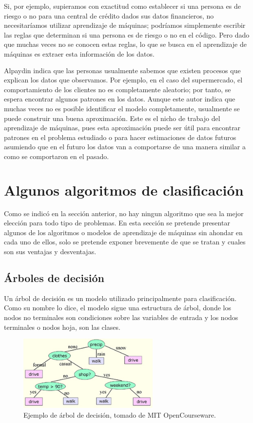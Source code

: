 \documentclass[a4paper, 11pt, oneside]{report}
\begin{document}
Si, por ejemplo, supieramos con exactitud como establecer si una persona es de riesgo o no para una central de crédito dados sus datos financieros, no necesitaríamos utilizar
aprendizaje de máquinas; podríamos simplemente escribir las reglas que determinan si una persona es de riesgo o no en el código. Pero dado que muchas veces no se conocen estas reglas, lo que se busca en el aprendizaje de máquinas es extraer esta información de los datos.\newline

Alpaydin indica que las personas usualmente sabemos que existen procesos que explican los datos que observamos. Por ejemplo, en el caso del supermercado, el comportamiento de los clientes no es completamente aleatorio; por tanto, se espera encontrar algunos patrones en los datos. Aunque este autor indica que muchas veces no es posible identificar el modelo completamente, usualmente se puede construir una buena aproximación. Este es el nicho de trabajo del aprendizaje de máquinas, pues esta aproximación puede ser útil para encontrar patrones en el problema estudiado o para hacer estimaciones de datos futuros asumiendo que en el futuro los datos van a comportarse de una manera similar a como se comportaron en el pasado.

\section{Algunos algoritmos de clasificación}

Como se indicó en la sección anterior, no hay ningun algoritmo que sea la mejor elección para todo tipo de problemas. En esta sección se pretende presentar algunos de los algoritmos o modelos de aprendizaje de máquinas sin ahondar en cada uno de ellos, solo se pretende exponer brevemente de que se tratan y cuales son sus ventajas y desventajas.

\subsection{Árboles de decisión}

Un árbol de decisión es un modelo utilizado principalmente para clasificación. Como su nombre lo dice, el modelo sigue una estructura de árbol, donde los nodos no terminales son condiciones sobre las variables de entrada y los nodos terminales o nodos hoja, son las clases.

\begin{figure}[htb]
\begin{center}
\leavevmode
\includegraphics[width=7cm]{img/decisiontree.jpg}
\end{center}
\caption{Ejemplo de árbol de decisión, tomado de MIT OpenCourseware.}
\label{fig:decisionTree}
\end{figure}
\end{document}
